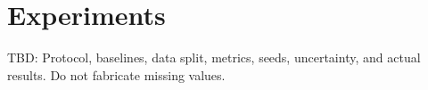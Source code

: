 \section{Experiments}
TBD: Protocol, baselines, data split, metrics, seeds, uncertainty, and actual results. Do not fabricate missing values.
